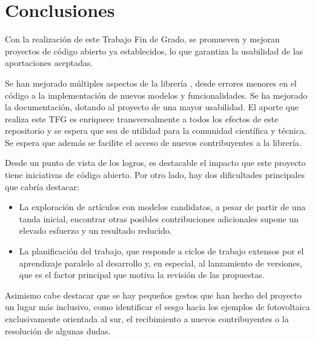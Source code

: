 
\section{Conclusiones} \label{sct:resultados:conclusiones}

Con la realización de este Trabajo Fin de Grado, se promueven y mejoran proyectos de código abierto ya establecidos, lo que garantiza la usabilidad de las aportaciones aceptadas.

Se han mejorado múltiples aspectos de la librería \pvlibpy, desde errores menores en el código a la implementación de nuevos modelos y funcionalidades. Se ha mejorado la documentación, dotando al proyecto de una mayor usabilidad. El aporte que realiza este TFG es enriquece transversalmente a todos los efectos de este \gls{repositorio} y se espera que sea de utilidad para la comunidad científica y técnica. Se espera que además se facilite el acceso de nuevos contribuyentes a la librería.

Desde un punto de vista de los logros, es destacable el impacto que este proyecto tiene iniciativas de código abierto. Por otro lado, hay dos dificultades principales que cabría destacar:

\begin{itemize}
    \item La exploración de artículos con modelos candidatos, a pesar de partir de una tanda inicial, encontrar otras posibles contribuciones adicionales supone un elevado esfuerzo y un resultado reducido.
    \item La planificación del trabajo, que responde a ciclos de trabajo extensos por el aprendizaje paralelo al desarrollo y, en especial, al lanzamiento de versiones, que es el factor principal que motiva la revisión de las propuestas.
\end{itemize}

Asimismo cabe destacar que se hay pequeños gestos que han hecho del proyecto un lugar más inclusivo, como identificar el sesgo hacia los ejemplos de fotovoltaica exclusivamente orientada al sur, el recibimiento a nuevos contribuyentes o la resolución de algunas dudas.


